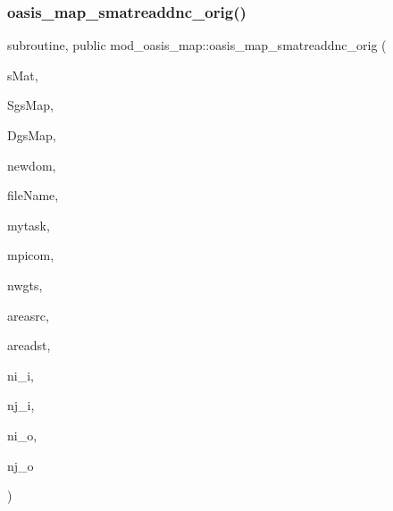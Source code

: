 \mbox{\label{namespacemod__oasis__map_acbe7b9e25c19dbbd2fbebd3895a87d64}} 
\subsubsection{\texorpdfstring{oasis\+\_\+map\+\_\+smatreaddnc\+\_\+orig()}{oasis\_map\_smatreaddnc\_orig()}}
{\footnotesize\ttfamily subroutine, public mod\+\_\+oasis\+\_\+map\+::oasis\+\_\+map\+\_\+smatreaddnc\+\_\+orig (\begin{DoxyParamCaption}\item[{type(mct\+\_\+smat), dimension(\+:), intent(out), pointer}]{s\+Mat,  }\item[{type(mct\+\_\+gsmap), intent(\hyperlink{namespacemod__oasis__map_aa58997467050224f6db2bc93fe5f7ca1}{in}), target}]{Sgs\+Map,  }\item[{type(mct\+\_\+gsmap), intent(\hyperlink{namespacemod__oasis__map_aa58997467050224f6db2bc93fe5f7ca1}{in}), target}]{Dgs\+Map,  }\item[{character($\ast$), intent(\hyperlink{namespacemod__oasis__map_aa58997467050224f6db2bc93fe5f7ca1}{in})}]{newdom,  }\item[{character($\ast$), intent(\hyperlink{namespacemod__oasis__map_aa58997467050224f6db2bc93fe5f7ca1}{in})}]{file\+Name,  }\item[{integer(\hyperlink{namespacemod__oasis__map_aa58997467050224f6db2bc93fe5f7ca1}{in}), intent(\hyperlink{namespacemod__oasis__map_aa58997467050224f6db2bc93fe5f7ca1}{in})}]{mytask,  }\item[{integer(\hyperlink{namespacemod__oasis__map_aa58997467050224f6db2bc93fe5f7ca1}{in}), intent(\hyperlink{namespacemod__oasis__map_aa58997467050224f6db2bc93fe5f7ca1}{in})}]{mpicom,  }\item[{integer(\hyperlink{namespacemod__oasis__map_aa58997467050224f6db2bc93fe5f7ca1}{in}), intent(out)}]{nwgts,  }\item[{type(mct\+\_\+avect), intent(out), optional}]{areasrc,  }\item[{type(mct\+\_\+avect), intent(out), optional}]{areadst,  }\item[{integer(\hyperlink{namespacemod__oasis__map_aa58997467050224f6db2bc93fe5f7ca1}{in}), intent(out), optional}]{ni\+\_\+i,  }\item[{integer(\hyperlink{namespacemod__oasis__map_aa58997467050224f6db2bc93fe5f7ca1}{in}), intent(out), optional}]{nj\+\_\+i,  }\item[{integer(\hyperlink{namespacemod__oasis__map_aa58997467050224f6db2bc93fe5f7ca1}{in}), intent(out), optional}]{ni\+\_\+o,  }\item[{integer(\hyperlink{namespacemod__oasis__map_aa58997467050224f6db2bc93fe5f7ca1}{in}), intent(out), optional}]{nj\+\_\+o }\end{DoxyParamCaption})}



